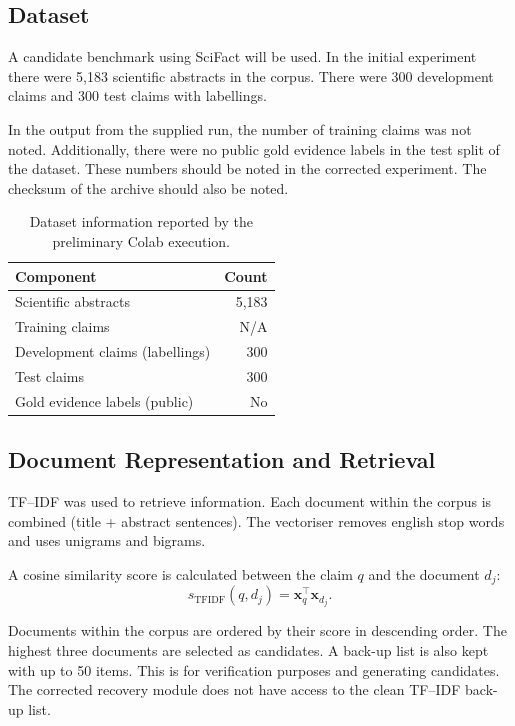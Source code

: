 \documentclass[11pt,a4paper]{article}
\begin{document}
\subsection{Dataset}

A candidate benchmark using SciFact will be used. In the initial experiment there were 5,183 scientific abstracts in the corpus. There were 300 development claims and 300 test claims with labellings.

In the output from the supplied run, the number of training claims was not noted. Additionally, there were no public gold evidence labels in the test split of the dataset. These numbers should be noted in the corrected experiment. The checksum of the archive should also be noted.

\begin{table}[H]
\centering
\caption{Dataset information reported by the preliminary Colab execution.}
\label{tab:dataset}
\begin{tabularx}{0.8\linewidth}{Xr}
\toprule
\textbf{Component} & \textbf{Count} \\
\midrule
Scientific abstracts & 5,183 \\
Training claims & N/A \\
Development claims (labellings) & 300 \\
Test claims & 300 \\
Gold evidence labels (public) & No \\
\bottomrule
\end{tabularx}
\end{table}

\subsection{Document Representation and Retrieval}

TF--IDF was used to retrieve information. Each document within the corpus is combined (title + abstract sentences). The vectoriser removes english stop words and uses unigrams and bigrams.

A cosine similarity score is calculated between the claim $q$ and the document $d_j$:
\begin{equation}
s_{\mathrm{TFIDF}}(q,d_j)=\mathbf{x}_q^\top\mathbf{x}_{d_j}.
\end{equation}

Documents within the corpus are ordered by their score in descending order. The highest three documents are selected as candidates. A back-up list is also kept with up to 50 items. This is for verification purposes and generating candidates. The corrected recovery module does not have access to the clean TF--IDF back-up list.
\end{document}
